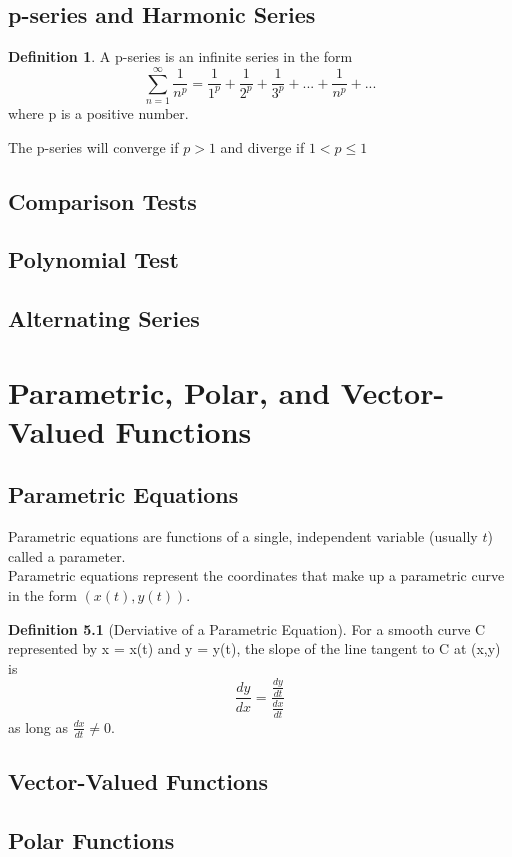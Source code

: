 \documentclass[letterpaper]{report}
\theoremstyle{definition}
\newtheorem{definition}{Definition}
\begin{document}
\section{p-series and Harmonic Series}
\begin{definition}
A p-series is an infinite series in the form
\[ \sum_{n=1}^\infty \frac{1}{n^p}=\frac{1}{1^p}+\frac{1}{2^p}
    +\frac{1}{3^p}+...+\frac{1}{n^p}+... \]
where p is a positive number.
\end{definition}
The p-series will converge if $p>1$ and diverge if $1<p\leq1$
\section{Comparison Tests}
\section{Polynomial Test}
\section{Alternating Series}

\chapter{Parametric, Polar, and Vector-Valued Functions}
\section{Parametric Equations}
Parametric equations are functions of a single, independent variable 
(usually $t$) called a parameter.\\
Parametric equations represent the coordinates that make up a parametric curve
in the form $(x(t), y(t))$.
\begin{definition}[Derviative of a Parametric Equation]
    For a smooth curve C represented by x = x(t) and y = y(t), 
    the slope of the line tangent to C at (x,y) is
\[ \frac{dy}{dx} = \frac{\frac{dy}{dt}}{\frac{dx}{dt}} \]
as long as $\frac{dx}{dt} \neq 0$. 
\end{definition}
\section{Vector-Valued Functions}
\section{Polar Functions}
\end{document}
